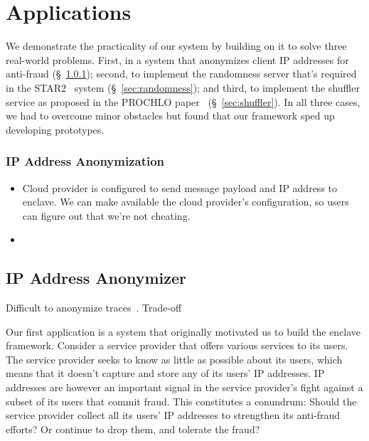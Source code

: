 \section{Applications}
\label{sec:applications}

We demonstrate the practicality of our system by building on it to solve three real-world problems.  First, in a system that anonymizes client IP addresses for anti-fraud (\S~\ref{sec:anonymization}); second, to implement the randomness server that's required in the STAR2~\cite{Davidson2021a} system (\S~\ref{sec:randomness}); and third, to implement the shuffler service as proposed in the PROCHLO paper~\cite{Bittau2017a} (\S~\ref{sec:shuffler}).  In all three cases, we had to overcome minor obstacles but found that our framework sped up developing prototypes.

\subsubsection{IP Address Anonymization}
\label{sec:anonymization}

\begin{itemize}
    \item Cloud provider is configured to send message payload and IP address to enclave. We can make available the cloud provider's configuration, so users can figure out that we're not cheating.
    \item 
\end{itemize}

\subsection{IP Address Anonymizer}

Difficult to anonymize traces~\cite{Burkhart10a}. Trade-off~\cite{Mohammady15a}

Our first application is a system that originally motivated us to build the enclave framework. Consider a service provider that offers various services to its users.  The service provider seeks to know as little as possible about its users, which means that it doesn't capture and store any of its users' IP addresses.  IP addresses are however an important signal in the service provider's fight against a subset of its users that commit fraud.  This constitutes a conundrum: Should the service provider collect all its users' IP addresses to strengthen its anti-fraud efforts?  Or continue to drop them, and tolerate the fraud?

